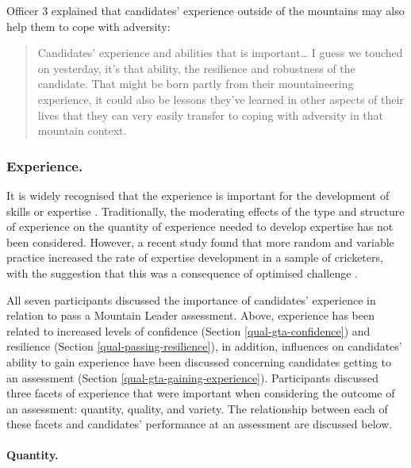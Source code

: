 \documentclass[
  12pt,
  a4paper,
]{book}
\begin{document}
Officer 3 explained that candidates' experience outside of the mountains may also help them to cope with adversity:

\begin{quote}
Candidates' experience and abilities that is important\ldots{} I guess we touched on yesterday, it's that ability, the resilience and robustness of the candidate. That might be born partly from their mountaineering experience, it could also be lessons they've learned in other aspects of their lives that they can very easily transfer to coping with adversity in that mountain context.
\end{quote}

\hypertarget{ml-qual-pass-exp}{%
\subsubsection{Experience.}\label{ml-qual-pass-exp}}

It is widely recognised that the experience is important for the development of skills or expertise \citep[cf.,][]{Baker2013, Baker2014, Ericsson1993, Jones2020}. Traditionally, the moderating effects of the type and structure of experience on the quantity of experience needed to develop expertise has not been considered. However, a recent study found that more random and variable practice increased the rate of expertise development in a sample of cricketers, with the suggestion that this was a consequence of optimised challenge \citep{Jones2020}.

All seven participants discussed the importance of candidates' experience in relation to pass a Mountain Leader assessment. Above, experience has been related to increased levels of confidence (Section \ref{qual-gta-confidence}) and resilience (Section \ref{qual-passing-resilience}), in addition, influences on candidates' ability to gain experience have been discussed concerning candidates getting to an assessment (Section \ref{qual-gta-gaining-experience}). Participants discussed three facets of experience that were important when considering the outcome of an assessment: quantity, quality, and variety. The relationship between each of these facets and candidates' performance at an assessment are discussed below.

\hypertarget{quantity.}{%
\paragraph{Quantity.}\label{quantity.}}
\end{document}
